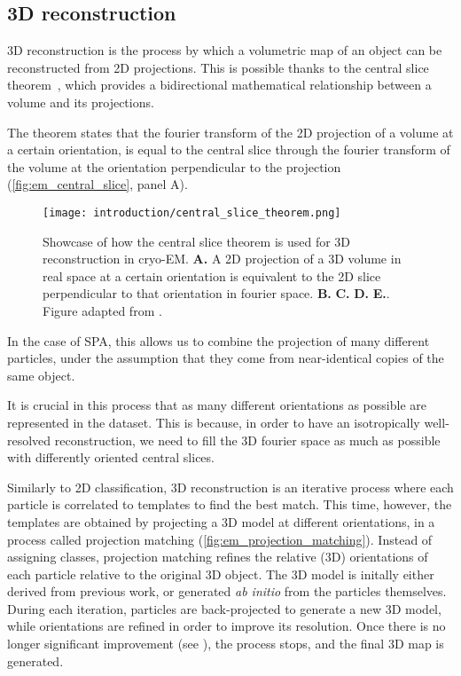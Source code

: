 \subsection{3D reconstruction}\label{em_reconstruction}

3D reconstruction is the process by which a volumetric map of an object can be reconstructed from 2D projections.
This is possible thanks to the central slice theorem~\cite{wikipediaProjectionsliceTheorem2023}, which provides a bidirectional mathematical relationship between a volume and its projections.

The theorem states that the fourier transform of the 2D projection of a volume at a certain orientation, is equal to the central slice through the fourier transform of the volume at the orientation perpendicular to the projection (\autoref{fig:em_central_slice}, panel A).

\begin{figure}[ht]
    \centering
    \texttt{[image: introduction/central\_slice\_theorem.png]}
    \caption[Central slice theorem]{Showcase of how the central slice theorem is used for 3D reconstruction in cryo-EM. \textbf{A.} A 2D projection of a 3D volume in real space at a certain orientation is equivalent to the 2D slice perpendicular to that orientation in fourier space. \textbf{B.} \textbf{C.} \textbf{D.} \textbf{E.}. Figure adapted from \citet{nogalesCryoEMUniqueTool2015}.}
    \label{fig:em_central_slice}
\end{figure}

In the case of SPA, this allows us to combine the projection of many different particles, under the assumption that they come from near-identical copies of the same object.

It is crucial in this process that as many different orientations as possible are represented in the dataset.
This is because, in order to have an isotropically well-resolved reconstruction, we need to fill the 3D fourier space as much as possible with differently oriented central slices.

Similarly to 2D classification, 3D reconstruction is an iterative process where each particle is correlated to templates to find the best match.
This time, however, the templates are obtained by projecting a 3D model at different orientations, in a process called projection matching (\autoref{fig:em_projection_matching}).
Instead of assigning classes, projection matching refines the relative (3D) orientations of each particle relative to the original 3D object.
The 3D model is initally either derived from previous work, or generated \textit{ab initio} from the particles themselves.
During each iteration, particles are back-projected to generate a new 3D model, while orientations are refined in order to improve its resolution.
Once there is no longer significant improvement (see ), the process stops, and the final 3D map is generated.

